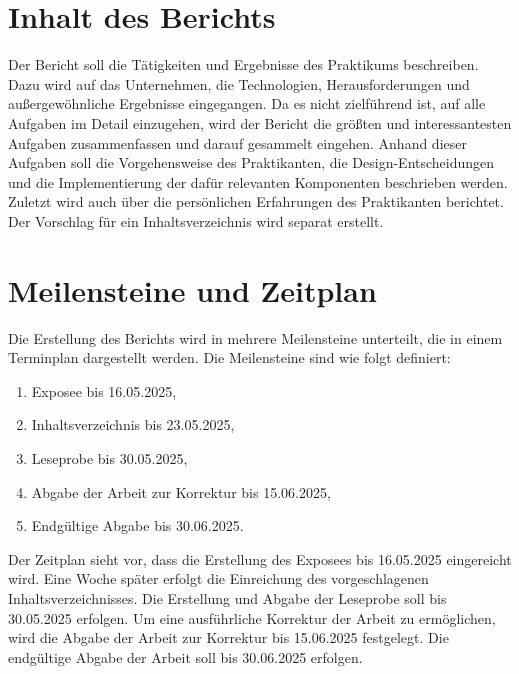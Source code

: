 \section{Inhalt des Berichts} \label{sec:inhalt}

Der Bericht soll die Tätigkeiten und Ergebnisse des Praktikums beschreiben. Dazu wird auf das Unternehmen, die Technologien, Herausforderungen und außergewöhnliche 
Ergebnisse eingegangen. Da es nicht zielführend ist, auf alle Aufgaben im Detail einzugehen, wird der Bericht die größten und interessantesten Aufgaben
zusammenfassen und darauf gesammelt eingehen. Anhand dieser Aufgaben soll die Vorgehensweise des Praktikanten, die Design-Entscheidungen und die Implementierung der dafür 
relevanten Komponenten beschrieben werden. Zuletzt wird auch über die persönlichen Erfahrungen des Praktikanten berichtet.
Der Vorschlag für ein Inhaltsverzeichnis wird separat erstellt.

\section{Meilensteine und Zeitplan} \label{sec:meilensteine}

Die Erstellung des Berichts wird in mehrere Meilensteine unterteilt, die in einem Terminplan
dargestellt werden. Die Meilensteine sind wie folgt definiert:

\begin{enumerate}
    \item Exposee bis 16.05.2025,
    \item Inhaltsverzeichnis bis 23.05.2025,
    \item Leseprobe bis 30.05.2025,
    \item Abgabe der Arbeit zur Korrektur bis 15.06.2025,
    \item Endgültige Abgabe bis 30.06.2025.
\end{enumerate}

Der Zeitplan sieht vor, dass die Erstellung des Exposees bis 16.05.2025 eingereicht wird. Eine Woche später erfolgt die Einreichung des vorgeschlagenen Inhaltsverzeichnisses.
Die Erstellung und Abgabe der Leseprobe soll bis 30.05.2025 erfolgen.
Um eine ausführliche Korrektur der Arbeit zu ermöglichen, wird die Abgabe der Arbeit zur Korrektur bis 15.06.2025 festgelegt.
Die endgültige Abgabe der Arbeit soll bis 30.06.2025 erfolgen.

